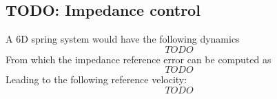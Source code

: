 \subsection{TODO: Impedance control}
A 6D spring system would have the following dynamics
\begin{equation}
TODO
\end{equation}
From which the impedance reference error can be computed as
\begin{equation}
TODO
\end{equation}
Leading to the following reference velocity:
\begin{equation}
TODO
\end{equation}
